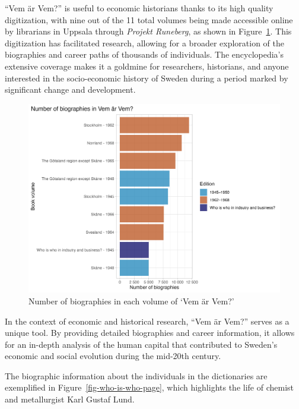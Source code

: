 \documentclass[
]{article}
\begin{document}
``Vem är Vem?'' is useful to economic historians thanks to its high
quality digitization, with nine out of the 11 total volumes being made
accessible online by librarians in Uppsala through \emph{Projekt
Runeberg}, as shown in Figure~\ref{fig-who-is-who-books}. This
digitization has facilitated research, allowing for a broader
exploration of the biographies and career paths of thousands of
individuals. The encyclopedia's extensive coverage makes it a goldmine
for researchers, historians, and anyone interested in the socio-economic
history of Sweden during a period marked by significant change and
development.

\begin{figure}

{\centering \includegraphics[width=5in,height=\textheight]{assets/who-is-who-volumes.png}

}

\caption{\label{fig-who-is-who-books}Number of biographies in each
volume of `Vem är Vem?'}

\end{figure}

In the context of economic and historical research, ``Vem är Vem?''
serves as a unique tool. By providing detailed biographies and career
information, it allows for an in-depth analysis of the human capital
that contributed to Sweden's economic and social evolution during the
mid-20th century.

The biographic information about the individuals in the dictionaries are
exemplified in Figure~\ref{fig-who-is-who-page}, which highlights the
life of chemist and metallurgist Karl Gustaf Lund.
\end{document}
